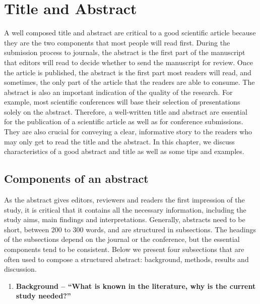 \documentclass[
]{book}
\providecommand{\tightlist}{%
  \setlength{\itemsep}{0pt}\setlength{\parskip}{0pt}}
\begin{document}
\hypertarget{title-and-abstract}{%
\chapter{Title and Abstract}\label{title-and-abstract}}

A well composed title and abstract are critical to a good scientific article because they are the two components that most people will read first. During the submission process to journals, the abstract is the first part of the manuscript that editors will read to decide whether to send the manuscript for review. Once the article is published, the abstract is the first part most readers will read, and sometimes, the only part of the article that the readers are able to consume. The abstract is also an important indication of the quality of the research. For example, most scientific conferences will base their selection of presentations solely on the abstract. Therefore, a well-written title and abstract are essential for the publication of a scientific article as well as for conference submissions. They are also crucial for conveying a clear, informative story to the readers who may only get to read the title and the abstract. In this chapter, we discuss characteristics of a good abstract and title as well as some tips and examples.

\hypertarget{components-of-an-abstract}{%
\section{Components of an abstract}\label{components-of-an-abstract}}

As the abstract gives editors, reviewers and readers the first impression of the study, it is critical that it contains all the necessary information, including the study aims, main findings and interpretations. Generally, abstracts need to be short, between 200 to 300 words, and are structured in subsections. The headings of the subsections depend on the journal or the conference, but the essential components tend to be consistent. Below we present four subsections that are often used to compose a structured abstract: background, methods, results and discussion.

\begin{enumerate}
\def\labelenumi{\arabic{enumi}.}
\tightlist
\item
  \textbf{Background -- ``What is known in the literature, why is the current study needed?''}
\end{enumerate}
\end{document}
